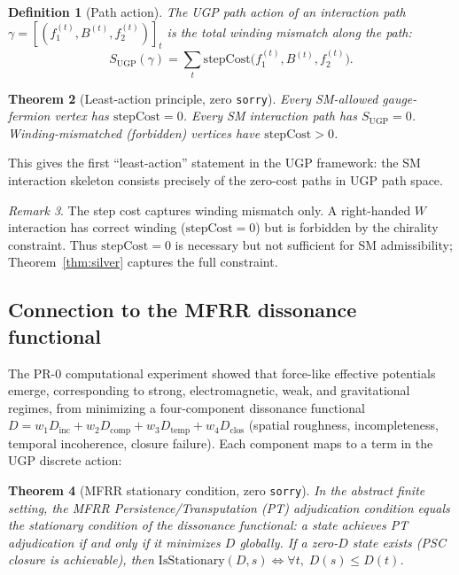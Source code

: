\documentclass[12pt]{article}
\newtheorem{theorem}{Theorem}[section]
\newtheorem{definition}[theorem]{Definition}
\theoremstyle{remark}
\newtheorem{remark}[theorem]{Remark}
\newcommand{\UGP}{\mathrm{UGP}}
\newcommand{\sorry}{\texttt{sorry}}
\begin{document}
\begin{definition}[Path action]
The \emph{UGP path action} of an interaction path
$\gamma = [(f_1^{(t)}, B^{(t)}, f_2^{(t)})]_{t}$
is the total winding mismatch along the path:
\[
  S_\UGP(\gamma) = \sum_{t} \mathrm{stepCost}\!\bigl(f_1^{(t)}, B^{(t)}, f_2^{(t)}\bigr).
\]
\end{definition}

\begin{theorem}[Least-action principle, zero \sorry]
\label{thm:action}
Every SM-allowed gauge-fermion vertex has $\mathrm{stepCost} = 0$.  Every
SM interaction path has $S_\UGP = 0$.  Winding-mismatched (forbidden) vertices
have $\mathrm{stepCost} > 0$.
\end{theorem}

This gives the first ``least-action'' statement in the UGP framework:
the SM interaction skeleton consists precisely of the zero-cost paths in UGP
path space.

\begin{remark}
The step cost captures winding mismatch only.  A right-handed $W$
interaction has correct winding ($\mathrm{stepCost} = 0$) but is
forbidden by the chirality constraint.  Thus $\mathrm{stepCost} = 0$ is
necessary but not sufficient for SM admissibility; Theorem~\ref{thm:silver}
captures the full constraint.
\end{remark}

\subsection{Connection to the MFRR dissonance functional}

The PR-0 computational experiment showed that force-like effective potentials emerge, corresponding to strong, electromagnetic, weak, and gravitational regimes,
from minimizing a four-component dissonance functional
$D = w_1 D_\text{inc} + w_2 D_\text{comp} + w_3 D_\text{temp} + w_4 D_\text{clos}$
(spatial roughness, incompleteness, temporal incoherence, closure failure).
Each component maps to a term in the UGP discrete action:

\begin{theorem}[MFRR stationary condition, zero \sorry]
In the abstract finite setting, the MFRR Persistence/Transputation (PT)
adjudication condition equals the stationary condition of the dissonance
functional: a state achieves PT adjudication if and only if it minimizes $D$
globally.  If a zero-$D$ state exists (PSC closure is achievable), then
$\mathrm{IsStationary}(D, s) \iff \forall t,\; D(s) \leq D(t)$.
\end{theorem}
\end{document}
